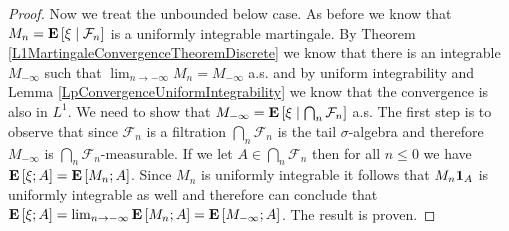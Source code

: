 \begin{proof}
Now we treat the unbounded below case.  As before we know that
$M_n = \textbf{E}\left[ \xi \mid \mathcal{F}_n \right]$ is a uniformly integrable
martingale.  By Theorem \ref{L1MartingaleConvergenceTheoremDiscrete}
we know that there is an integrable $M_{-\infty}$ such that $\lim_{n \to -\infty}
M_n = M_{-\infty}$ a.s. and by uniform
integrability and Lemma \ref{LpConvergenceUniformIntegrability} we
know that the convergence is also in $L^1$.  We need to show that $M_{-\infty} =
\textbf{E}\left[ \xi \mid \bigcap_n \mathcal{F}_n \right]$ a.s.  The first step
is to observe that since $\mathcal{F}_n$ is a filtration $\bigcap_n
\mathcal{F}_n$ is the tail $\sigma$-algebra and therefore $M_{-\infty}$ is
$\bigcap_n \mathcal{F}_n$-measurable.  If we let $A \in \bigcap_n
\mathcal{F}_n$ then for all $n \leq 0$ we have $\textbf{E}\left[\xi ; A\right]
= \textbf{E}\left[M_n;A\right]$.  Since $M_n$ is uniformly integrable it
follows that $M_n \textbf{1}_{A}$ is uniformly integrable as well and therefore can conclude
that $\textbf{E}\left[\xi ; A\right] = \lim_{n \to -\infty} \textbf{E}\left[M_n;A\right]
= \textbf{E}\left[M_{-\infty};A\right]$.  The result is proven.
\end{proof}

